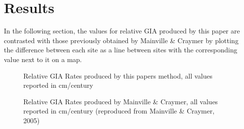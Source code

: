 \section{Results}
In the following section, the values for relative GIA produced by this paper are
contrasted with those previously obtained by Mainville \& Craymer by plotting the
difference between each site as a line between sites with the corresponding value
next to it on a map.

\begin{figure}[h]
	\caption{Relative GIA Rates produced by this papers method, all values reported in cm/century}
	\label{fig:myGIARates}
\end{figure}
\newpage
\begin{figure}[h]
	\caption{Relative GIA Rates produced by Mainville \& Craymer, all values reported in cm/century (reproduced from Mainville \& Craymer, 2005)}
	\label{fig:craymerGIARatesBigPlot}
\end{figure}


